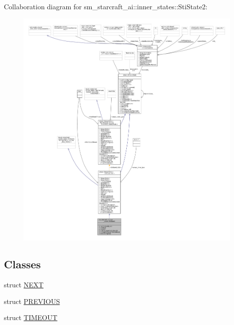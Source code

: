 Collaboration diagram for sm\+\_\+starcraft\+\_\+ai\+:\+:inner\+\_\+states\+:\+:Sti\+State2\+:
\nopagebreak
\begin{figure}[H]
\begin{center}
\leavevmode
\includegraphics[width=350pt]{structsm__starcraft__ai_1_1inner__states_1_1StiState2__coll__graph}
\end{center}
\end{figure}
\subsection*{Classes}
\begin{DoxyCompactItemize}
\item 
struct \hyperlink{structsm__starcraft__ai_1_1inner__states_1_1StiState2_1_1NEXT}{N\+E\+XT}
\item 
struct \hyperlink{structsm__starcraft__ai_1_1inner__states_1_1StiState2_1_1PREVIOUS}{P\+R\+E\+V\+I\+O\+US}
\item 
struct \hyperlink{structsm__starcraft__ai_1_1inner__states_1_1StiState2_1_1TIMEOUT}{T\+I\+M\+E\+O\+UT}
\end{DoxyCompactItemize}
